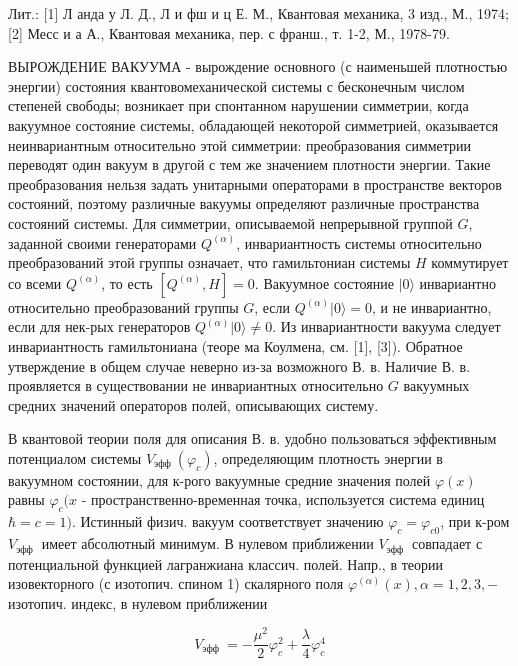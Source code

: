 \documentclass[10pt]{article}
\begin{document}
Лит.: [1] Л анда у Л. Д., Л и фш и ц Е. М., Квантовая механика, 3 изд., М., 1974; [2] Месс и а А., Квантовая механика, пер. с франш., т. 1-2, М., 1978-79.



ВЫРОЖДЕНИЕ ВАКУУМА - вырождение основного (с наименьшей плотностью энергии) состояния квантовомеханической системы с бесконечным числом степеней свободы; возникает при спонтанном нарушении симметрии, когда вакуумное состояние системы, обладающей некоторой симметрией, оказывается неинвариантным относительно этой симметрии: преобразования симметрии переводят один вакуум в другой с тем же значением плотности энергии. Такие преобразования нельзя задать унитарными операторами в пространстве векторов состояний, поэтому различные вакуумы определяют различные пространства состояний системы. Для симметрии, описываемой непрерывной группой $G$, заданной своими генераторами $Q^{(\alpha)}$, инвариантность системы относительно преобразований этой группы означает, что гамильтониан системы $H$ коммутирует со всеми $Q^{(\alpha)}$, то есть $\left[Q^{(\alpha)}, H\right]=0$. Вакуумное состояние $|0\rangle$ инвариантно относительно преобразований группы $G$, если $Q^{(\alpha)}|0\rangle=0$, и не инвариантно, если для нек-рых генераторов $Q^{(\alpha)}|0\rangle \neq 0$. Из инвариантности вакуума следует инвариантность гамильтониана (теоре ма Коулмена, см. [1], [3]). Обратное утверждение в общем случае неверно из-за возможного В. в. Наличие В. в. проявляется в существовании не инвариантных относительно $G$ вакуумных средних значений операторов полей, описывающих систему.



В квантовой теории поля для описания В. в. удобно пользоваться эффективным потенциалом системы $V_{\text {эфф }}\left(\varphi_{c}\right)$, определяющим плотность энергии в вакуумном состоянии, для к-рого вакуумные средние значения полей $\varphi(x)$ равны $\varphi_{c}(x$ - пространственно-временная точка, используется система единиц $\hbar=c=1)$. Истинный физич. вакуум соответствует значению $\varphi_{c}=\varphi_{c 0}$, при к-ром $V_{\text {эфф }}$ имеет абсолютный минимум. В нулевом приближении $V_{\text {эфф }}$ совпадает с потенциальной функцией лагранжиана классич. полей. Напр., в теории изовекторного (с изотопич. спином 1) скалярного поля $\varphi^{(\alpha)}(x), \alpha=1,2,3,-$ изотопич. индекс, в нулевом приближении



\[

V_{\text {эфф }}=-\frac{\mu^{2}}{2} \varphi_{c}^{2}+\frac{\lambda}{4} \varphi_{c}^{4}

\]
\end{document}
